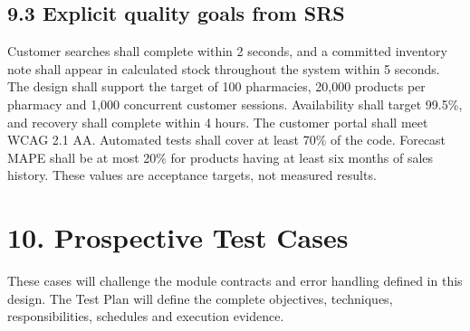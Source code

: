 \subsection{9.3 Explicit quality goals from SRS}\label{explicit-quality-goals-from-srs}

Customer searches shall complete within 2 seconds, and a committed inventory note shall appear in calculated stock throughout the system within 5 seconds. The design shall support the target of 100 pharmacies, 20,000 products per pharmacy and 1,000 concurrent customer sessions. Availability shall target 99.5\%, and recovery shall complete within 4 hours. The customer portal shall meet WCAG 2.1 AA. Automated tests shall cover at least 70\% of the code. Forecast MAPE shall be at most 20\% for products having at least six months of sales history. These values are acceptance targets, not measured results.

\clearpage
\section{10. Prospective Test Cases}\label{prospective-test-cases}

These cases will challenge the module contracts and error handling defined in this design. The Test Plan will define the complete objectives, techniques, responsibilities, schedules and execution evidence.

